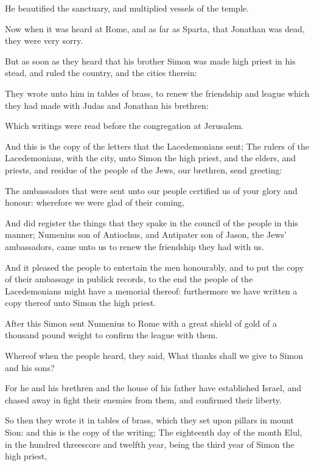 {\par }{\PP {}He beautified the sanctuary, and multiplied vessels of the temple.
\par }{\PP {}Now when it was heard at Rome, and as far as Sparta, that Jonathan was dead, they were very sorry.
\par }{\PP {}But as soon as they heard that his brother Simon was made high priest in his stead, and ruled the country, and the cities therein:
\par }{\PP {}They wrote unto him in tables of brass, to renew the friendship and league which they had made with Judas and Jonathan his brethren:
\par }{\PP {}Which writings were read before the congregation at Jerusalem.
\par }{\PP {}And this is the copy of the letters that the Lacedemonians sent; The rulers of the Lacedemonians, with the city, unto Simon the high priest, and the elders, and priests, and residue of the people of the Jews, our brethren, send greeting:
\par }{\PP {}The ambassadors that were sent unto our people certified us of your glory and honour: wherefore we were glad of their coming,
\par }{\PP {}And did register the things that they spake in the council of the people in this manner; Numenius son of Antiochus, and Antipater son of Jason, the Jews’ ambassadors, came unto us to renew the friendship they had with us.
\par }{\PP {}And it pleased the people to entertain the men honourably, and to put the copy of their ambassage in publick records, to the end the people of the Lacedemonians might have a memorial thereof: furthermore we have written a copy thereof unto Simon the high priest.
\par }{\PP {}After this Simon sent Numenius to Rome with a great shield of gold of a thousand pound weight to confirm the league with them.
\par }{\PP {}Whereof when the people heard, they said, What thanks shall we give to Simon and his sons?
\par }{\PP {}For he and his brethren and the house of his father have established Israel, and chased away in fight their enemies from them, and confirmed their liberty.
\par }{\PP {}So then they wrote it in tables of brass, which they set upon pillars in mount Sion: and this is the copy of the writing; The eighteenth day of the month Elul, in the hundred threescore and twelfth year, being the third year of Simon the high priest,
}
